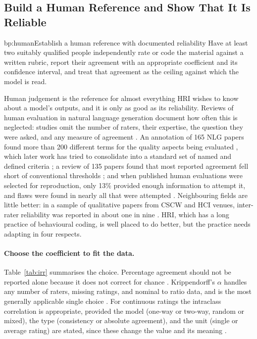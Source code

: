 \subsection{Build a Human Reference and Show That It Is Reliable}

\begin{practice}{bp:human}{Establish a human reference with documented reliability}
Have at least two suitably qualified people independently rate or code the
material against a written rubric, report their agreement with an appropriate
coefficient and its confidence interval, and treat that agreement as the
ceiling against which the model is read.
\end{practice}

Human judgement is the reference for almost everything HRI wishes to know
about a model's outputs, and it is only as good as its reliability. Reviews
of human evaluation in natural language generation document how often this
is neglected: studies omit the number of raters, their expertise, the
question they were asked, and any measure of agreement
\cite{vanderlee2021human}. An annotation of 165 NLG papers found more than
200 different terms for the quality aspects being evaluated
\cite{howcroft2020twenty}, which later work has tried to consolidate into a
standard set of named and defined criteria \cite{belz2025standard}; a review
of 135 papers found that most reported agreement fell short of conventional
thresholds \cite{amidei2019agreement}; and when published human evaluations
were selected for reproduction, only 13\% provided enough information to
attempt it, and flaws were found in nearly all that were attempted
\cite{belz2023missing,thomson2024common}. Neighbouring fields are little better: in a sample
of qualitative papers from CSCW and HCI venues, inter-rater reliability was
reported in about one in nine \cite{mcdonald2019reliability}. HRI, which has
a long practice of behavioural coding, is well placed to do better, but the
practice needs adapting in four respects.

\paragraph{Choose the coefficient to fit the data.} Table~\ref{tab:irr}
summarises the choice. Percentage agreement should not be reported alone
because it does not correct for chance \cite{cohen1960coefficient,
hallgren2012computing}. Krippendorff's $\alpha$ handles any number of raters,
missing ratings, and nominal to ratio data, and is the most generally
applicable single choice \cite{hayes2007answering,krippendorff2019content}.
For continuous ratings the intraclass correlation is appropriate, provided
the model (one-way or two-way, random or mixed), the type (consistency or
absolute agreement), and the unit (single or average rating) are stated,
since these change the value and its meaning
\cite{shrout1979intraclass,koo2016guideline}.

